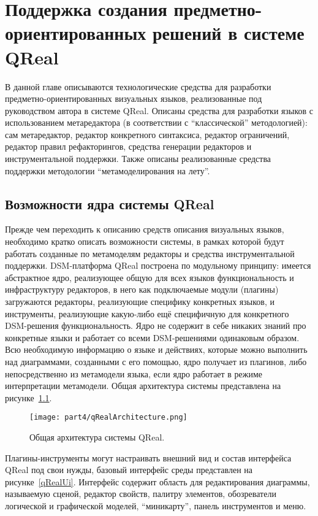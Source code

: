 \chapter{Поддержка создания предметно-ориентированных решений в системе QReal}
\label{chapterImplementation}

В данной главе описываются технологические средства для разработки предметно-ориентированных 
визуальных языков, реализованные под руководством автора в системе QReal. Описаны 
средства для разработки языков с использованием метаредактора (в соответствии с "`классической"' 
методологией): сам метаредактор, редактор конкретного синтаксиса, редактор ограничений, 
редактор правил рефакторингов, средства генерации редакторов и инструментальной поддержки. 
Также описаны реализованные средства поддержки методологии "`метамоделирования на лету"'.

\section{Возможности ядра системы QReal}
Прежде чем переходить к описанию средств описания визуальных языков, необходимо кратко 
описать возможности системы, в рамках которой будут работать созданные по метамоделям 
редакторы и средства инструментальной поддержки. DSM-платформа QReal построена по 
модульному принципу: имеется абстрактное ядро, реализующее общую для всех языков функциональность 
и инфраструктуру редакторов, в него как подключаемые модули (плагины) загружаются редакторы, 
реализующие специфику конкретных языков, и инструменты, реализующие какую-либо ещё 
специфичную для конкретного DSM-решения функциональность. Ядро не содержит в себе 
никаких знаний про конкретные языки и работает со всеми DSM-решениями одинаковым образом. 
Всю необходимую информацию о языке и действиях, которые можно выполнить над диаграммами, 
созданными с его помощью, ядро получает из плагинов, либо непосредственно из метамодели 
языка, если ядро работает в режиме интерпретации метамодели. Общая архитектура системы 
представлена на рисунке~\ref{qRealArchitecture}.

\begin{figure} [ht]
	\begin{center}
		\texttt{[image: part4/qRealArchitecture.png]}
		\caption{Общая архитектура системы QReal.}
		\label{qRealArchitecture}
	\end{center}
\end{figure}

Плагины-инструменты могут настраивать внешний вид и состав интерфейса QReal под свои 
нужды, базовый интерфейс среды представлен на рисунке~\ref{qRealUi}. Интерфейс содержит 
область для редактирования диаграммы, называемую сценой, редактор свойств, палитру 
элементов, обозреватели логической и графической моделей, "`миникарту"', панель инструментов и меню.

